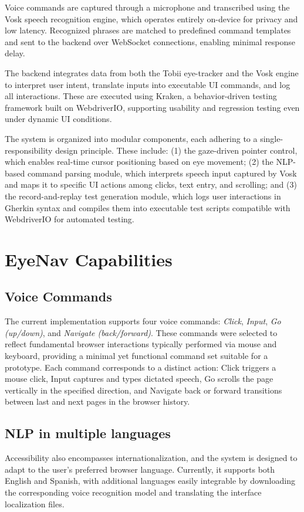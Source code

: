 Voice commands are captured through a microphone and transcribed using the Vosk speech recognition engine\cite{vosk2025}, which operates entirely on-device for privacy and low latency. Recognized phrases are matched to predefined command templates and sent to the backend over WebSocket connections, enabling minimal response delay.

The backend integrates data from both the Tobii eye-tracker and the Vosk engine to interpret user intent, translate inputs into executable UI commands, and log all interactions. These are executed using Kraken, a behavior-driven testing framework built on WebdriverIO\cite{webdriverio}, supporting usability and regression testing even under dynamic UI conditions.

The system is organized into modular components, each adhering to a single-responsibility design principle. These include: (1) the gaze-driven pointer control, which enables real-time cursor positioning based on eye movement; (2) the NLP-based command parsing module, which interprets speech input captured by Vosk and maps it to specific UI actions among clicks, text entry, and scrolling; and (3) the record-and-replay test generation module, which logs user interactions in Gherkin syntax and compiles them into executable test scripts compatible with WebdriverIO for automated testing.

\section{EyeNav Capabilities}
\subsection{Voice Commands}

The current implementation supports four voice commands: \textit{Click}, \textit{Input}, \textit{Go (up/down)}, and \textit{Navigate (back/forward)}. These commands were selected to reflect fundamental browser interactions typically performed via mouse and keyboard, providing a minimal yet functional command set suitable for a prototype. Each command corresponds to a distinct action: Click triggers a mouse click, Input captures and types dictated speech, Go scrolls the page vertically in the specified direction, and Navigate back or forward transitions between last and next pages in the browser history.

\subsection{NLP in multiple languages}
Accessibility also encompasses internationalization, and the system is designed to adapt to the user's preferred browser language. Currently, it supports both English and Spanish, with additional languages easily integrable by downloading the corresponding voice recognition model and translating the interface localization files.

